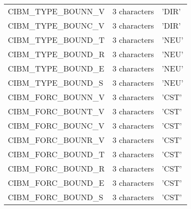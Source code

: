 \begin{longtable} {|p{}|p{}|p{}|}
CIBM\_TYPE\_BOUNN\_V & 3 characters  & 'DIR'         \\
CIBM\_TYPE\_BOUNC\_V & 3 characters  & 'DIR'         \\
CIBM\_TYPE\_BOUND\_T & 3 characters  & 'NEU'         \\
CIBM\_TYPE\_BOUND\_R & 3 characters  & 'NEU'         \\
CIBM\_TYPE\_BOUND\_E & 3 characters  & 'NEU'         \\
CIBM\_TYPE\_BOUND\_S & 3 characters  & 'NEU'         \\\hline
CIBM\_FORC\_BOUNN\_V & 3 characters  & 'CST'         \\
CIBM\_FORC\_BOUNT\_V & 3 characters  & 'CST'         \\
CIBM\_FORC\_BOUNC\_V & 3 characters  & 'CST'         \\
CIBM\_FORC\_BOUNR\_V & 3 characters  & 'CST'         \\
CIBM\_FORC\_BOUND\_T & 3 characters  & 'CST'         \\
CIBM\_FORC\_BOUND\_R & 3 characters  & 'CST'         \\
CIBM\_FORC\_BOUND\_E & 3 characters  & 'CST'         \\
CIBM\_FORC\_BOUND\_S & 3 characters  & 'CST'         \\
\end{longtable}

